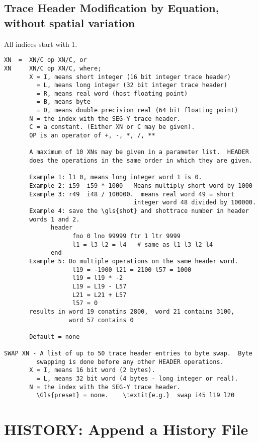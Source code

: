 \subsection{Trace Header Modification by Equation, without spatial variation}
All indices start with 1.

\begin{verbatim}
XN  =  XN/C op XN/C, or
XN     XN/C op XN/C, where;
       X = I, means short integer (16 bit integer trace header)
         = L, means long integer (32 bit integer trace header)
         = R, means real word (host floating point)
         = B, means byte
         = D, means double precision real (64 bit floating point)
       N = the index with the SEG-Y trace header.
       C = a constant. (Either XN or C may be given).
       OP is an operator of +, -, *, /, **

       A maximum of 10 XNs may be given in a parameter list.  HEADER
       does the operations in the same order in which they are given.

       Example 1: l1 0, means long integer word 1 is 0.
       Example 2: i59  i59 * 1000   Means multiply short word by 1000
       Example 3: r49  i48 / 100000.  means real word 49 = short
                                    integer word 48 divided by 100000.
       Example 4: save the \gls{shot} and shottrace number in header
       words 1 and 2.
             header
                   fno 0 lno 99999 ftr 1 ltr 9999
                   l1 = l3 l2 = l4   # same as l1 l3 l2 l4
             end
       Example 5: Do multiple operations on the same header word.
                   l19 = -1900 l21 = 2100 l57 = 1000
                   l19 = l19 * -2
                   L19 = L19 - L57
                   L21 = L21 + L57
                   l57 = 0
       results in word 19 conatins 2800,  word 21 contains 3100,
                  word 57 contains 0

       Default = none

SWAP XN - A list of up to 50 trace header entries to byte swap.  Byte
         swapping is done before any other HEADER operations.
       X = I, means 16 bit word (2 bytes).
         = L, means 32 bit word (4 bytes - long integer or real).
       N = the index with the SEG-Y trace header.
         \Gls{preset} = none.    \textit{e.g.}  swap i45 l19 l20

\end{verbatim}

\section{HISTORY: Append a History File}
\label{cmd_history}

